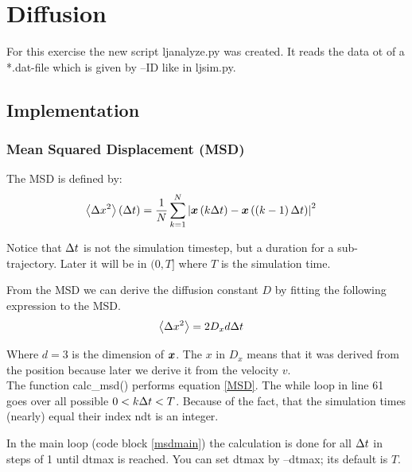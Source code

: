 \section{Diffusion}

For this exercise the new script ljanalyze.py was created.
It reads the data ot of a *.dat-file which is given by --ID like in ljsim.py.

\subsection{Implementation}

\subsubsection{Mean Squared Displacement (MSD)}

The MSD is defined by:
\begin{align}
\left\langle \Delta x^2\right\rangle\left( \Delta t\right)
	&= \frac{1}{N}\sum_{k=1}^{N}\left| \boldsymbol{x}\left( k\Delta t\right) - \boldsymbol{x}\left(\left( k-1\right)\Delta t\right)\right|^2
	\label{MSD}
\end{align}

Notice that $\Delta t$ is not the simulation timestep, but a duration for a sub-trajectory. 
Later it will be in $(0,T]$ where $T$ is the simulation time.

From the MSD we can derive the diffusion constant $D$ by fitting the following expression to the MSD.
\begin{align}
\left\langle \Delta x^2\right\rangle 
	&= 2D_xd\Delta t
	\label{fit}
\end{align}

Where $d=3$ is the dimension of $\boldsymbol{x}$.
The $x$ in $D_x$ means that it was derived from the position because later we derive it from the velocity $v$.\\

The function calc\_msd() performs equation \eqref{MSD}.
The while loop in line 61 goes over all possible $0 < k\Delta t < T$.
Because of the fact, that the simulation times (nearly) equal their index ndt is an integer.


In the main loop (code block \ref{msdmain}) the calculation is done for all $\Delta t$ in steps of 1 until dtmax is reached. 
You can set dtmax by --dtmax; its default is $T$.

 
